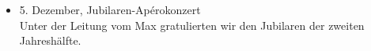\begin{history}
\begin{itemize}
            \item 5. Dezember, Jubilaren-Apérokonzert\\
                  Unter der Leitung vom Max gratulierten wir den Jubilaren der
                  zweiten Jahreshälfte.

      \end{itemize}

\end{history}

